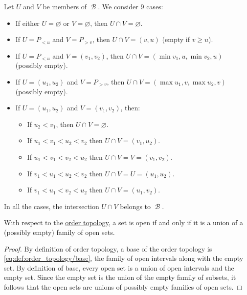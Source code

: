 \begin{defproof}
   Let \( U \) and \( V \) be members of \( \mscrB \). We consider \( 9 \) cases:
  \begin{itemize}
    \item If either \( U = \varnothing \) or \( V = \varnothing \), then \( U \cap V = \varnothing \).
    \item If \( U = P_{<u} \) and \( V = P_{>v} \), then \( U \cap V = (v, u) \) (empty if \( v \geq u \)).
    \item If \( U = P_{<u} \) and \( V = (v_1, v_2) \), then \( U \cap V = (\min{v_1, u}, \min{v_2, u}) \) (possibly empty).
    \item If \( U = (u_1, u_2) \) and \( V = P_{>v} \), then \( U \cap V = (\max{u_1, v}, \max{u_2, v}) \) (possibly empty).
    \item If \( U = (u_1, u_2) \) and \( V = (v_1, v_2) \), then:
    \begin{itemize}
      \item If \( u_2 < v_1 \), then \( U \cap V = \varnothing \).
      \item If \( u_1 < v_1 < u_2 < v_2 \) then \( U \cap V = (v_1, u_2) \).
      \item If \( u_1 < v_1 < v_2 < u_2 \) then \( U \cap V = V = (v_1, v_2) \).
      \item If \( v_1 < u_1 < u_2 < v_2 \) then \( U \cap V = U = (u_1, u_2) \).
      \item If \( v_1 < u_1 < v_2 < u_2 \) then \( U \cap V = (u_1, v_2) \).
    \end{itemize}
  \end{itemize}

  In all the cases, the intersection \( U \cap V \) belongs to \( \mscrB \).
\end{defproof}

\begin{proposition}\label{thm:order_topology_open_set}
  With respect to the \hyperref[def:order_topology]{order topology}, a set is open if and only if it is a union of a (possibly empty) family of open sets.
\end{proposition}
\begin{proof}
  By definition of order topology, a base of the order topology is \eqref{eq:def:order_topology/base}, the family of open intervals along with the empty set. By definition of base, every open set is a union of open intervals and the empty set. Since the empty set is the union of the empty family of subsets, it follows that the open sets are unions of possibly empty families of open sets.
\end{proof}

